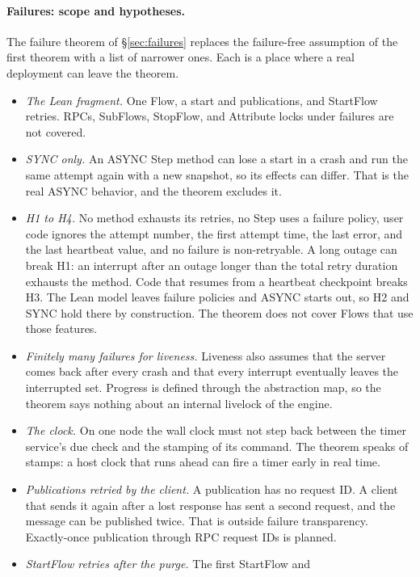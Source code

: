 \paragraph{Failures: scope and hypotheses.}
The failure theorem of \S\ref{sec:failures} replaces the failure-free
assumption of the first theorem with a list of narrower ones. Each is a
place where a real deployment can leave the theorem.
\begin{itemize}
\item \emph{The Lean fragment.} One Flow, a start and publications, and
  StartFlow retries. RPCs, SubFlows, StopFlow, and Attribute locks under
  failures are not covered.
\item \emph{SYNC only.} An ASYNC Step method can lose a start in a crash
  and run the same attempt again with a new snapshot, so its effects can
  differ. That is the real ASYNC behavior, and the theorem excludes it.
\item \emph{H1 to H4.} No method exhausts its retries, no Step uses a
  failure policy, user code ignores the attempt number, the first attempt
  time, the last error, and the last heartbeat value, and no failure is
  non-retryable. A long outage can break H1: an interrupt after an outage
  longer than the total retry duration exhausts the method. Code that
  resumes from a heartbeat checkpoint breaks H3. The Lean model leaves
  failure policies and ASYNC starts out, so H2 and SYNC hold there by
  construction. The theorem does not cover Flows that use those features.
\item \emph{Finitely many failures for liveness.} Liveness also assumes
  that the server comes back after every crash and that every interrupt
  eventually leaves the interrupted set. Progress is defined through the abstraction map, so the theorem
  says nothing about an internal livelock of the engine.
\item \emph{The clock.} On one node the wall clock must not step back
  between the timer service's due check and the stamping of its command.
  The theorem speaks of stamps: a host clock that runs ahead can fire a
  timer early in real time.
\item \emph{Publications retried by the client.} A publication has no
  request ID. A client that sends it again after a lost response has sent a
  second request, and the message can be published twice. That is outside
  failure transparency. Exactly-once publication through RPC request IDs is
  planned.
\item \emph{StartFlow retries after the purge.} The first StartFlow and

\end{itemize}
